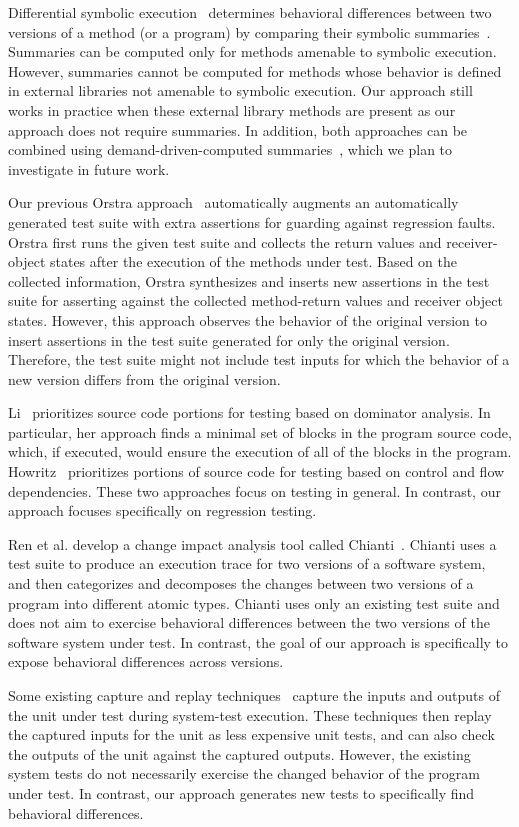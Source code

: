 Differential symbolic execution~\cite{DSE} determines behavioral differences between two versions of a method (or a program) by comparing their symbolic summaries~\cite{CSE}. Summaries can be computed only for methods amenable to symbolic execution. However, summaries cannot be computed for methods whose behavior is defined in external libraries not amenable to symbolic execution. Our approach still works in practice when these external library methods are present as our approach does not require summaries. In addition, both approaches can be combined using demand-driven-computed summaries~\cite{demandDriven}, which we plan to investigate in future work.

Our previous Orstra approach~\cite{xie06:ecoop} automatically augments an automatically generated test suite with extra assertions for guarding against regression faults. Orstra first runs the given test suite and collects the return values and receiver-object states after the execution of the methods under test. Based on the collected information, Orstra synthesizes and inserts new assertions in the test suite for asserting against the collected method-return values and receiver object states. However, this approach observes the behavior of the original version to insert assertions in the test suite generated for only the original version. Therefore, the  test suite might not include test inputs for which the behavior of a new version differs from the original version.

Li~\cite{jjli:prioritization} prioritizes source code portions for testing based on dominator analysis. In particular, her approach finds a minimal set of blocks in the program source code, which, if executed, would ensure the execution of all of the blocks in the program. Howritz~\cite{howritz:prioritization} prioritizes  portions of source code for testing based on control and flow dependencies. These two approaches focus on testing in general. In contrast, our approach focuses specifically on regression testing.

Ren et al. develop a change impact analysis tool called Chianti~\cite{chianti}. Chianti uses a test suite to produce an execution trace for two versions of a software system, and then
categorizes and decomposes the changes between two versions of a program into different atomic types. Chianti uses only an existing test suite and
does not aim to exercise behavioral differences between the two
versions of the software system under test. In contrast, the goal of
our approach is specifically to expose behavioral differences across
versions.

Some existing capture and replay techniques~\cite{elbaum, orso:selective, SaffAPE2005} capture
the inputs and outputs of the unit under test during system-test execution. 
These techniques then replay the captured inputs for the
unit as less expensive unit tests, and can also check the outputs of
the unit against the captured outputs. However, the existing system tests do not necessarily exercise the changed behavior of the program under test. In contrast, our approach generates new tests to specifically find behavioral differences.